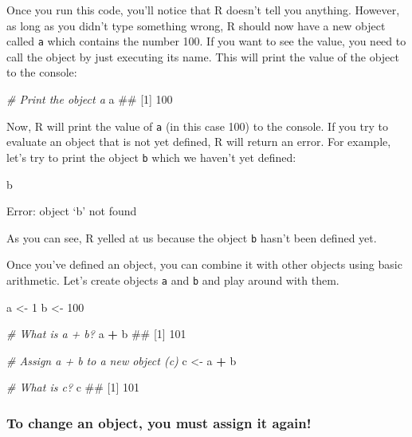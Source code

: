 \documentclass[]{book}
\newenvironment{Shaded}{\begin{snugshade}}{\end{snugshade}}
\newcommand{\DecValTok}[1]{\textcolor[rgb]{0.00,0.00,0.81}{#1}}
\newcommand{\StringTok}[1]{\textcolor[rgb]{0.31,0.60,0.02}{#1}}
\newcommand{\CommentTok}[1]{\textcolor[rgb]{0.56,0.35,0.01}{\textit{#1}}}
\newcommand{\OperatorTok}[1]{\textcolor[rgb]{0.81,0.36,0.00}{\textbf{#1}}}
\newcommand{\NormalTok}[1]{#1}
\theoremstyle{definition}
\theoremstyle{definition}
\theoremstyle{remark}
\begin{document}
Once you run this code, you'll notice that R doesn't tell you anything.
However, as long as you didn't type something wrong, R should now have a
new object called \texttt{a} which contains the number 100. If you want
to see the value, you need to call the object by just executing its
name. This will print the value of the object to the console:

\begin{Shaded}
\begin{Highlighting}[]
\CommentTok{# Print the object a}
\NormalTok{a}
\NormalTok{## [1] 100}
\end{Highlighting}
\end{Shaded}

Now, R will print the value of \texttt{a} (in this case 100) to the
console. If you try to evaluate an object that is not yet defined, R
will return an error. For example, let's try to print the object
\texttt{b} which we haven't yet defined:

\begin{Shaded}
\begin{Highlighting}[]
\NormalTok{b}
\end{Highlighting}
\end{Shaded}

Error: object `b' not found

As you can see, R yelled at us because the object \texttt{b} hasn't been
defined yet.

Once you've defined an object, you can combine it with other objects
using basic arithmetic. Let's create objects \texttt{a} and \texttt{b}
and play around with them.

\begin{Shaded}
\begin{Highlighting}[]
\NormalTok{a <-}\StringTok{ }\DecValTok{1}
\NormalTok{b <-}\StringTok{ }\DecValTok{100}

\CommentTok{# What is a + b?}
\NormalTok{a }\OperatorTok{+}\StringTok{ }\NormalTok{b}
\NormalTok{## [1] 101}

\CommentTok{# Assign a + b to a new object (c)}
\NormalTok{c <-}\StringTok{ }\NormalTok{a }\OperatorTok{+}\StringTok{ }\NormalTok{b}

\CommentTok{# What is c?}
\NormalTok{c}
\NormalTok{## [1] 101}
\end{Highlighting}
\end{Shaded}

\subsubsection{To change an object, you must assign it
again!}\label{to-change-an-object-you-must-assign-it-again}
\end{document}
